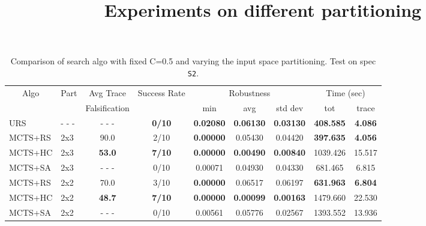 \documentclass[11pt]{article}
\begin{document}
\begin{table}[ht]
\centering
\title{Experiments on different partitioning}
\begin{tabular}{|l|l|c|c|c|c|c|c|c|}
\hline
\multicolumn{1}{|c|}{\multirow{2}{*}{Algo}} & \multirow{2}{*}{Part} & Avg Trace               & \multirow{2}{*}{Success Rate} & \multicolumn{3}{c|}{Robustness} & \multicolumn{2}{c|}{Time (sec)} \\ \cline{5-9} 
\multicolumn{1}{|c|}{}                      &                    & Falsification           &                               & min      & avg      & std dev  & tot        & trace        \\ \hline
URS                                         & - - -              & - - -                   & \textbf{0/10}                 & \textbf{0.02080}  & \textbf{0.06130}  & \textbf{0.03130}  &  \textbf{408.585}   &  \textbf{4.086}       \\ \hline
MCTS+RS                                     & 2x3                &  90.0                   & 2/10                          & \textbf{0.00000}  & 0.05430  & 0.04420  &  \textbf{397.635}   &  \textbf{4.056}       \\
MCTS+HC                                     & 2x3                &  \textbf{53.0}                   & \textbf{7/10}                          & \textbf{0.00000}  & \textbf{0.00490}  & \textbf{0.00840}  & 1039.426   & 15.517       \\
MCTS+SA                                     & 2x3                & - - -                   & 0/10                          & 0.00071  & 0.04930  & 0.04330  &  681.465   &  6.815       \\ \hline

MCTS+RS                                     & 2x2                &  70.0                   & 3/10                          & \textbf{0.00000}  & 0.06517  & 0.06197  &  \textbf{631.963}   &  \textbf{6.804}       \\
MCTS+HC                                     & 2x2                &  \textbf{48.7}                   & \textbf{7/10}                          & \textbf{0.00000}  & \textbf{0.00099}  & \textbf{0.00163}  & 1479.660   & 22.530       \\
MCTS+SA                                     & 2x2                & - - -                   & 0/10                          & 0.00561  & 0.05776  & 0.02567  & 1393.552   & 13.936       \\ \hline
\end{tabular}
\caption{Comparison of search algo with fixed C=0.5 and varying the input space partitioning. Test on spec \texttt{S2}.}~\label{table:patitioning}
\end{table}
\end{document}

